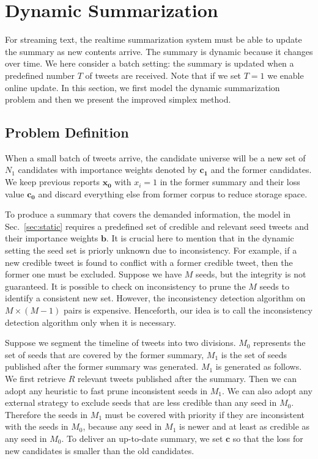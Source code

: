 \documentclass[envcountsame]{llncs}
\begin{document}
\section{Dynamic Summarization}\label{sec:dynamic}
For streaming text, the realtime summarization system must be able to update the summary as new contents arrive. The summary is dynamic because it changes over time. We here consider a batch setting: the summary is updated when a predefined number $T$ of tweets are received. Note that if we set $T=1$ we enable online update.  In this section, we first model the dynamic summarization problem and then we present the improved simplex method.

\subsection{Problem Definition}
When a small batch of tweets arrive, the candidate universe will be a new set of $N_1 $ candidates with importance weights denoted by $\mathbf{c_1}$ and the former candidates. We keep previous reports $\mathbf{x_0}$ with $x_i=1$ in the former summary and their loss value $\mathbf{c_0}$  and discard everything else from former corpus to reduce storage space.

To produce a summary that covers the demanded information, the model in Sec.~\ref{sec:static} requires a predefined set of credible and relevant seed tweets and their importance weights $\mathbf{b}$. It is crucial here to mention that in the dynamic setting the seed set is priorly unknown due to inconsistency. For example, if a new credible tweet is found to conflict with a former credible tweet, then the former one must be excluded. Suppose we have $M$ seeds, but the integrity is not guaranteed. It is possible to check on inconsistency to prune the $M$ seeds to identify a consistent new set. However, the inconsistency detection algorithm on $M\times (M-1)$ pairs is expensive. Henceforth, our idea is to call the inconsistency detection algorithm only when it is necessary.

Suppose we segment the timeline of tweets into two divisions. $M_0$ represents the set of seeds that are covered by the former summary, $M_1$ is the set of seeds published after the former summary was generated. $M_1$ is generated as follows. We first retrieve $R$ relevant tweets published after the summary. Then we can adopt any heuristic to fast prune inconsistent seeds in $M_1$. We can also adopt any external strategy to exclude seeds that are less credible than any seed in $M_0$. Therefore the seeds in $M_1$ must be covered with priority if they are inconsistent with the seeds in $M_0$, because any seed in  $M_1$ is newer and at least as credible as any seed in $M_0$.  To deliver an up-to-date summary, we set $\mathbf{c}$ so that the loss for new candidates is smaller than the old candidates.
\end{document}
